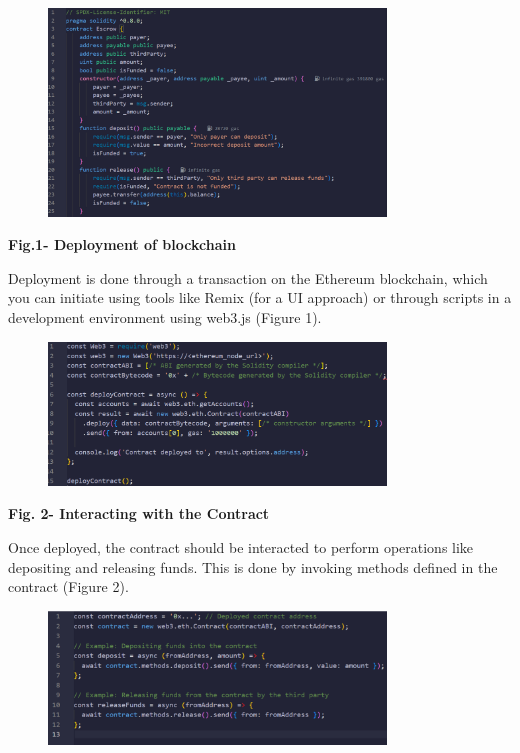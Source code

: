 \begin{figure}[H]
	\centering
	\includegraphics[width=0.8\textwidth]{assets/78}
	\caption*{}
\end{figure}

\textbf{Fig.1- Deployment of blockchain}

Deployment is done through a transaction on the Ethereum blockchain,
which you can initiate using tools like Remix (for a UI approach) or
through scripts in a development environment using web3.js (Figure 1).

\begin{figure}[H]
	\centering
	\includegraphics[width=0.8\textwidth]{assets/79}
	\caption*{}
\end{figure}

\textbf{Fig. 2- Interacting with the Contract}

Once deployed, the contract should be interacted to perform operations
like depositing and releasing funds. This is done by invoking methods
defined in the contract (Figure 2).

\begin{figure}[H]
	\centering
	\includegraphics[width=0.8\textwidth]{assets/80}
	\caption*{}
\end{figure}

